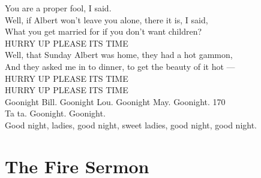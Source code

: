 \documentclass{article}
\begin{document}
You are a proper fool, I said. \\
Well, if Albert won't leave you alone, there it is, I said, \\
What you get married for if you don't want children? \\
HURRY UP PLEASE ITS TIME \\
Well, that Sunday Albert was home, they had a hot gammon, \\
And they asked me in to dinner, to get the beauty of it hot --- \\
HURRY UP PLEASE ITS TIME \\
HURRY UP PLEASE ITS TIME \\
Goonight Bill. Goonight Lou. Goonight May. Goonight.              \hfill 170 \\
Ta ta. Goonight. Goonight. \\
Good night, ladies, good night, sweet ladies, good night, good night.

\section{The Fire Sermon}
\end{document}
